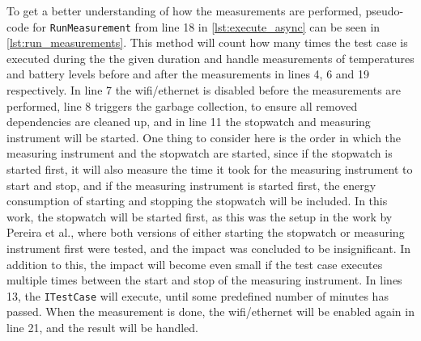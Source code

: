 To get a better understanding of how the measurements are performed, pseudo-code for \texttt{RunMeasurement} from line 18 in \cref{lst:execute_async} can be seen in \cref{lst:run_measurements}. This method will count how many times the test case is executed during the the given duration and handle measurements of temperatures and battery levels before and after the measurements in lines 4, 6 and 19 respectively. In line 7 the wifi/ethernet is disabled before the measurements are performed, line 8 triggers the garbage collection, to ensure all removed dependencies are cleaned up, and in line 11 the stopwatch and measuring instrument will be started. One thing to consider here is the order in which the measuring instrument and the stopwatch are started, since if the stopwatch is started first, it will also measure the time it took for the measuring instrument to start and stop, and if the measuring instrument is started first, the energy consumption of starting and stopping the stopwatch will be included. In this work, the stopwatch will be started first, as this was the setup in the work by Pereira et al.\cite[]{Pereira2017}, where both versions of either starting the stopwatch or measuring instrument first were tested, and the impact was concluded to be insignificant. In addition to this, the impact will become even small if the test case executes multiple times between the start and stop of the measuring instrument. In lines 13, the \texttt{ITestCase} will execute, until some predefined number of minutes has passed. When the measurement is done, the wifi/ethernet will be enabled again in line 21, and the result will be handled.





